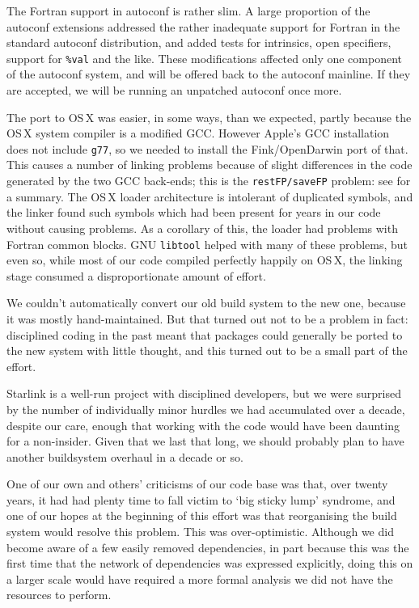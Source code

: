 \documentclass{speauth}
\begin{document}
The Fortran support in autoconf is rather slim.  A large proportion of the
autoconf extensions addressed the rather inadequate support for
Fortran in the standard autoconf distribution, and added tests for
intrinsics, open specifiers, support for \texttt{\%val} 
and the like.  These modifications affected only one component of the
autoconf system, and will be offered back to the autoconf mainline.
If they are accepted, we will be running an unpatched autoconf once more.

The port to OS\,X was easier, in some ways, than we expected, partly
because the OS\,X system compiler is a modified GCC.  However Apple's
GCC installation does not include \texttt{g77}, so we needed to
install the Fink/OpenDarwin port of that.  This causes a number of
linking problems because of slight differences in the code generated
by the two GCC back-ends; this is the \texttt{restFP/saveFP} problem:
see \cite{gray04} for a summary.  The OS\,X loader architecture is
intolerant of duplicated symbols, and the linker found such symbols
which had been present for years in our code without causing problems.
As a corollary of this, the loader had problems with Fortran common
blocks.  GNU \texttt{libtool} helped with many of these problems, but
even so, while most of our code compiled perfectly happily on OS\,X,
the linking stage consumed a disproportionate amount of effort.

We couldn't automatically convert our old build system to the new one,
because it was mostly hand-maintained.  But that turned out not to be
a problem in fact: disciplined coding in the past meant that packages
could generally be ported to the new system with little thought, and
this turned out to be a small part of the effort.

Starlink is a well-run project with disciplined developers, but we
were surprised by the number of individually minor hurdles we had
accumulated over a decade, despite our care, enough that working with
the code would have been daunting for a non-insider.  Given that we
last that long, we should probably plan to have another buildsystem
overhaul in a decade or so.

One of our own and others' criticisms of our code base was that, over
twenty years, it had had plenty time to fall victim to `big sticky
lump' syndrome, and one of our hopes at the beginning of this effort
was that reorganising the build system would resolve this problem.
This was over-optimistic.  Although we did become aware of a few
easily removed dependencies, in part because this was the first time
that the network of dependencies was expressed explicitly, doing this
on a larger scale would have required a more formal analysis we did
not have the resources to perform.
\end{document}

